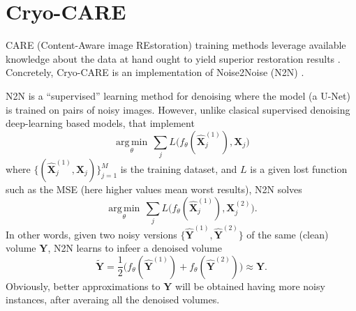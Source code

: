 \documentclass{article}
\begin{document}


\section{Cryo-CARE \cite{buchholz2019cryo}}
CARE (Content-Aware image REstoration) training methods leverage
available knowledge about the data at hand ought to yield superior
restoration results \cite{weigert2018content}. Concretely, Cryo-CARE
is an implementation of Noise2Noise (N2N) \cite{lehtinen2018noise2noise}.

N2N is a ``supervised'' learning method for denoising where the model
(a U-Net) is trained on pairs of noisy images. However, unlike
clasical supervised denoising deep-learning based models, that
implement
\begin{equation}
  \underset{\theta}{\operatorname{arg\,min}} \, \sum_j L \big(f_\theta(\hat{\mathbf X}_j^{(1)}), {\mathbf X}_j\big)
\end{equation}
where $\{(\hat{\mathbf X}_j^{(1)}, {\mathbf X}_j)\}_{j=1}^M$ is the training
dataset, and $L$ is a given lost function such as the MSE (here higher
values mean worst results), N2N solves
\begin{equation}
  \underset{\theta}{\operatorname{arg\,min}} \, \sum_j L \big(f_\theta(\hat{\mathbf X}_j^{(1)}), {\mathbf X}_j^{(2)}\big).
\end{equation}
In other words, given two noisy versions
$\{\hat{\mathbf Y}^{(1)}, \hat{\mathbf Y}^{(2)}\}$ of the same (clean)
volume ${\mathbf Y}$, N2N learns to infeer a denoised volume
\begin{equation}
  \tilde{\mathbf Y}=\frac{1}{2}\big(f_\theta(\hat{\mathbf Y}^{(1)})+f_\theta(\hat{\mathbf Y}^{(2)})\big)\approx{\mathbf Y}.
\end{equation}
Obviously, better approximations to ${\mathbf Y}$ will be obtained
having more noisy instances, after averaing all the denoised volumes.
\end{document}

